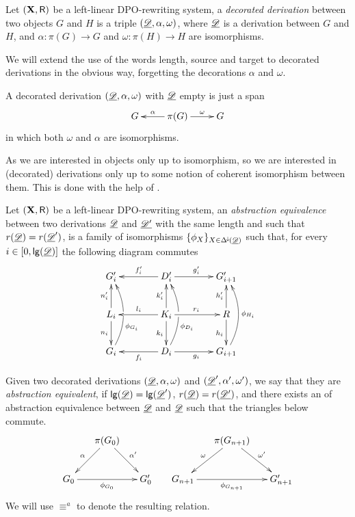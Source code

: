 \begin{definition}
	Let $(\textbf {\textup{X}}, \mathsf{R})$ be a left-linear DPO-rewriting system, a \emph{decorated derivation} between two objects $G$ and $H$ is a triple $(\underline{\mathscr{D}}, \alpha, \omega)$, where $\underline{\mathscr{D}}$ is a derivation between $G$ and $H$, and $\alpha\colon \pi(G)\to G$ and $\omega\colon \pi(H)\to H$ are isomorphisms.
\end{definition}

\begin{notation}
	We will extend the use of the words length, source and target to decorated derivations in the obvious way, forgetting the decorations $\alpha$ and $\omega$.
\end{notation}

\begin{example}A decorated derivation $(\underline{\mathscr{D}}, \alpha, \omega)$ with $\underline{\mathscr{D}}$ empty is just a span
	\[\xymatrix{G & \pi(G) \ar[r]^-{\omega} \ar[l]_-{\alpha} & G}\]
	in which both $\omega$ and $\alpha$ are isomorphisms.
\end{example}

As we are interested in objects only up to isomorphism, so we are interested in (decorated) derivations only up to some notion of coherent isomorphism between them. This is done with the help of .

\begin{definition}Let $(\textbf {\textup{X}}, \mathsf{R})$ be a left-linear DPO-rewriting system,  an \emph{abstraction equivalence} between two derivations $\underline{\mathscr{D}}$ and $\underline{\mathscr{D'}}$ with the same length and such that $r(\underline{\mathscr{D}})=r(\underline{\mathscr{D}}')$, is a family of isomorphisms $\{\phi_X\}_{X\in \Delta^{\hspace{-1pt}\downarrow\hspace{-1pt}}(\underline{\mathscr{D}})}$ such that, for every $i\in [0, \mathsf{lg}(\underline{\mathscr{D}})]$ the following diagram commutes
	\[\xymatrix@C=40pt{G'_i&D'_i \ar[r]^{g'_i} \ar[l]_{f'_i}&G'_{i+1}\\  L_i \ar[u]^{n'_i} \ar[d]_{n_i}& K_i \ar[u]^{k'_i} \ar[d]_{k_i} \ar[r]^{r_i} \ar[l]_{l_i} &R\ar[u]^{h'_i} \ar[d]_{h_i}\\G_i \ar@/_.45cm/[uu]_(.35){\phi_{G_i}}|\hole&D_i\ar[l]^{f_i}\ar@/_.45cm/[uu]_(.35){\phi_{D_i}}|\hole \ar[r]_{g_i}&G_{i+1}\ar@/_.45cm/[uu]_{\phi_{H_i}}}\]

Given two decorated derivations $(\underline{\mathscr{D}}, \alpha, \omega)$ and $(\underline{\mathscr{D}}', \alpha', \omega')$, we say that they are \emph{abstraction equivalent}, if $\mathsf{lg}(\underline{\mathscr{D}})=\mathsf{lg}(\underline{\mathscr{D}}')$, $r(\underline{\mathscr{D}})=r(\underline{\mathscr{D'}})$, and there exists an of abstraction equivalence between $\underline{\mathscr{D}}$ and  $\underline{\mathscr{D}}$ such that the triangles below commute.
\[\xymatrix@C=15pt{&\pi(G_0) \ar[dr]^{\alpha'} \ar[dl]_{\alpha}&&& \pi(G_{n+1}) \ar[dr]^{\omega'} \ar[dl]_{\omega}\\ G_0 \ar[rr]_{\phi_{G_0}} && G'_0 &G_{n+1} \ar[rr]_{\phi_{G_{n+1}}} && G'_{n+1} } \]
We will use $\equiv^a$ to denote the resulting relation.
\end{definition}

